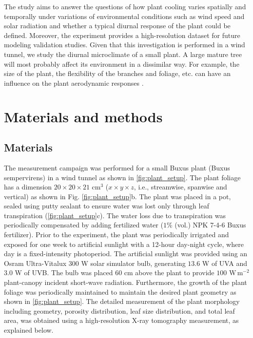The study aims to answer the questions of how plant cooling varies spatially and temporally under variations of environmental conditions such as wind speed and solar radiation and whether a typical diurnal response of the plant could be defined. Moreover, the experiment provides a high-resolution dataset for future modeling validation studies. Given that this investigation is performed in a wind tunnel, we study the diurnal microclimate of a small plant. A large mature tree will most probably affect its environment in a dissimilar way. For example, the size of the plant, the flexibility of the branches and foliage, etc. can have an influence on the plant aerodynamic responses \citep{DeLangre2008,Manickathan2018b}. 

\section{Materials and methods}

\subsection{Materials}


The measurement campaign was performed for a small Buxus plant (Buxus sempervirens) in a wind tunnel as shown in \cref{fig:plant_setup}. The plant foliage has a dimension $20\times20\times21$ cm$^3$ ($x\times y\times z$, i.e., streamwise, spanwise and vertical) as shown in Fig. \cref{fig:plant_setup}b. The plant was placed in a pot, sealed using putty sealant to ensure water was lost only through leaf transpiration (\cref{fig:plant_setup}c). The water loss due to transpiration was periodically compensated by adding fertilized water ($1$\% (vol.) NPK 7-4-6 Buxus fertilizer). Prior to the experiment, the plant was periodically irrigated and exposed for one week to artificial sunlight with a 12-hour day-night cycle, where day is a fixed-intensity photoperiod. The artificial sunlight was provided using an Osram Ultra-Vitalux $300$ W solar simulator bulb, generating $13.6$ W of UVA and $3.0$ W of UVB. The bulb was placed 60 cm above the plant to provide $100$ W\,m$^{-2}$ plant-canopy incident short-wave radiation. Furthermore, the growth of the plant foliage was periodically maintained to maintain the desired plant geometry as shown in \cref{fig:plant_setup}. The detailed measurement of the plant morphology including geometry, porosity distribution, leaf size distribution, and total leaf area, was obtained using a high-resolution X-ray tomography measurement, as explained below. 


